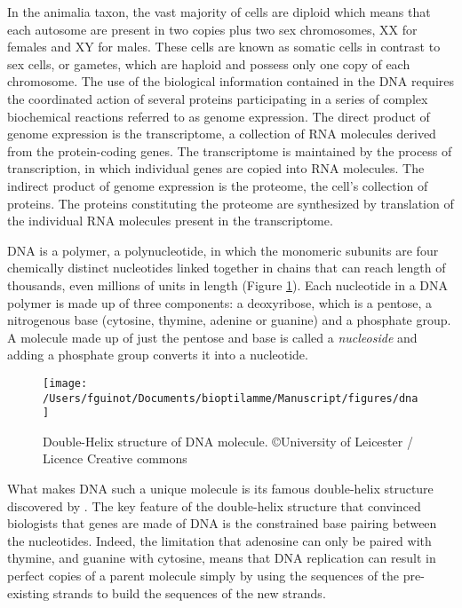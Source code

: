 \documentclass[]{book}
\begin{document}
In the animalia taxon, the vast majority of cells are diploid which
means that each autosome are present in two copies plus two sex
chromosomes, XX for females and XY for males. These cells are known as
somatic cells in contrast to sex cells, or gametes, which are haploid
and possess only one copy of each chromosome. The use of the biological
information contained in the DNA requires the coordinated action of
several proteins participating in a series of complex biochemical
reactions referred to as genome expression. The direct product of genome
expression is the transcriptome, a collection of RNA molecules derived
from the protein-coding genes. The transcriptome is maintained by the
process of transcription, in which individual genes are copied into RNA
molecules. The indirect product of genome expression is the proteome,
the cell's collection of proteins. The proteins constituting the
proteome are synthesized by translation of the individual RNA molecules
present in the transcriptome.

DNA is a polymer, a polynucleotide, in which the monomeric subunits are
four chemically distinct nucleotides linked together in chains that can
reach length of thousands, even millions of units in length (Figure
\ref{fig:dna}). Each nucleotide in a DNA polymer is made up of three
components: a deoxyribose, which is a pentose, a nitrogenous base
(cytosine, thymine, adenine or guanine) and a phosphate group. A
molecule made up of just the pentose and base is called a \emph{nucleoside}
and adding a phosphate group converts it into a nucleotide.



\begin{figure}

{\centering \texttt{[image: /Users/fguinot/Documents/bioptilamme/Manuscript/figures/dna]} 

}

\caption{Double-Helix structure of DNA molecule. \copyright University of Leicester / Licence Creative commons}\label{fig:dna}
\end{figure}

What makes DNA such a unique molecule is its famous double-helix
structure discovered by \citep{crick_watson_prsl1954}. The key feature of the
double-helix structure that convinced biologists that genes are made of
DNA is the constrained base pairing between the nucleotides. Indeed, the
limitation that adenosine can only be paired with thymine, and guanine
with cytosine, means that DNA replication can result in perfect copies
of a parent molecule simply by using the sequences of the pre-existing
strands to build the sequences of the new strands.
\end{document}
